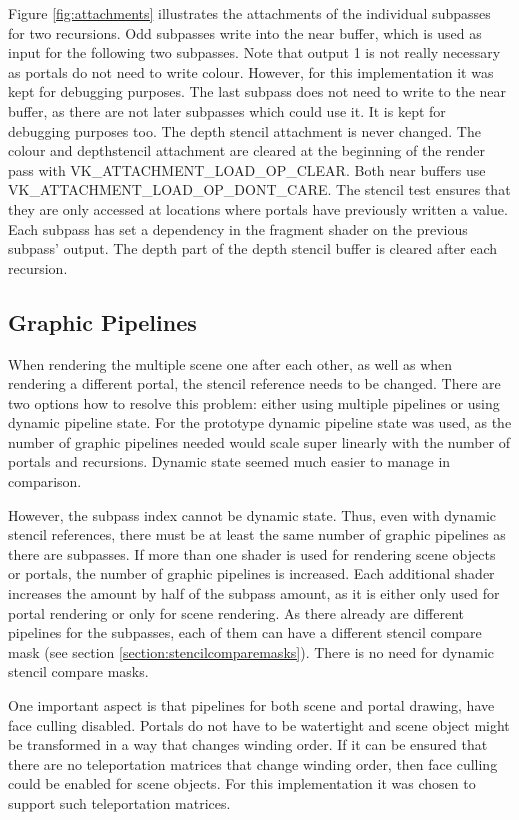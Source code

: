 Figure \ref{fig:attachments} illustrates the attachments of the individual subpasses for two recursions. Odd subpasses write into the near buffer, which is used as input for the following two subpasses.  Note that output 1 is not really necessary as portals do not need to write colour. However, for this implementation it was kept for debugging purposes. The last subpass does not need to write to the near buffer, as there are not later subpasses which could use it. It is kept for debugging purposes too. The depth stencil attachment is never changed. The colour and depthstencil attachment are cleared at the beginning of the render pass with VK\_ATTACHMENT\_LOAD\_OP\_CLEAR. Both near buffers use VK\_ATTACHMENT\_LOAD\_OP\_DONT\_CARE. The stencil test ensures that they are only accessed at locations where portals have previously written a value. Each subpass has set a dependency in the fragment shader on the previous subpass' output. The depth part of the depth stencil buffer is cleared after each recursion.


\subsection{Graphic Pipelines}
When rendering the multiple scene one after each other, as well as when rendering a different portal, the stencil reference needs to be changed. There are two options how to resolve this problem: either using multiple pipelines or using dynamic pipeline state. For the prototype dynamic pipeline state was used, as the number of graphic pipelines needed would scale super linearly with the number of portals and recursions. Dynamic state seemed much easier to manage in comparison.

However, the subpass index cannot be dynamic state. Thus, even with dynamic stencil references, there must be at least the same number of graphic pipelines as there are subpasses. If more than one shader is used for rendering scene objects or portals, the number of graphic pipelines is increased. Each additional shader increases the amount by half of the subpass amount, as it is either only used for portal rendering or only for scene rendering. As there already are different pipelines for the subpasses, each of them can have a different stencil compare mask (see section \ref{section:stencilcomparemasks}). There is no need for dynamic stencil compare masks.

One important aspect is that pipelines for both scene and portal drawing, have face culling disabled. Portals do not have to be watertight and scene object might be transformed in a way that changes winding order. If it can be ensured that there are no teleportation matrices that change winding order, then face culling could be enabled for scene objects. For this implementation it was chosen to support such teleportation matrices.

